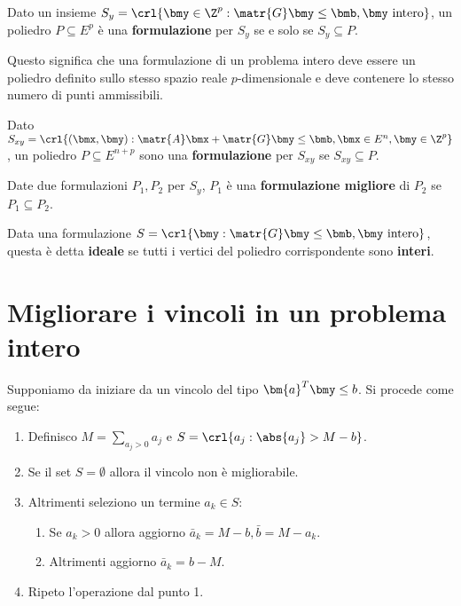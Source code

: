 \documentclass[\main/main.tex]{subfiles}
\begin{document}
\begin{definition}[Formulazione]
    Dato un insieme \(S_y = \crl{\bmy \in \Z^p: \matr{G}\bmy\leq \bmb, \bmy \text{ intero}}\), un poliedro \(P \subseteq E^p\) è una \textbf{formulazione} per \(S_y\) se e solo se \(S_y \subseteq P\).

    Questo significa che una formulazione di un problema intero deve essere un poliedro definito sullo stesso spazio reale \(p\)-dimensionale e deve contenere lo stesso numero di punti ammissibili.
\end{definition}

\begin{definition}
    Dato \(S_{xy} = \crl{(\bmx, \bmy): \matr{A}\bmx + \matr{G}\bmy \leq \bmb, \bmx \in E^n, \bmy \in \Z^p}\), un poliedro \(P\subseteq E^{n+p}\) sono una \textbf{formulazione} per \(S_{xy}\) se \(S_{xy} \subseteq P\).
\end{definition}

\begin{definition}
    Date due formulazioni \(P_1, P_2\) per \(S_y\), \(P_1\) è una \textbf{formulazione migliore} di \(P_2\) se \(P_1 \subseteq P_2\).
\end{definition}

\begin{definition}
    Data una formulazione \(S = \crl{\bmy: \matr{G}\bmy \leq \bmb, \bmy \text{ intero}}\), questa è detta \textbf{ideale} se tutti i vertici del poliedro corrispondente sono \textbf{interi}.
\end{definition}

\section{Migliorare i vincoli in un problema intero}
Supponiamo da iniziare da un vincolo del tipo \(\bm{a}^T\bmy\leq b \). Si procede come segue:

\begin{enumerate}
    \item Definisco \(M = \sum_{a_j>0}a_j\) e \(S = \crl{a_j: \abs{a_j}>M-b}\).
    \item Se il set \(S=\emptyset \) allora il vincolo non è migliorabile.
    \item Altrimenti seleziono un termine \(a_k \in S\):
    \begin{enumerate}
        \item Se \(a_k>0\) allora aggiorno \(\bar{a}_k = M - b, \bar{b} = M-a_k\).
        \item Altrimenti aggiorno \(\bar{a}_k = b - M\).
    \end{enumerate}
    \item Ripeto l'operazione dal punto 1.
\end{enumerate}
\end{document}
